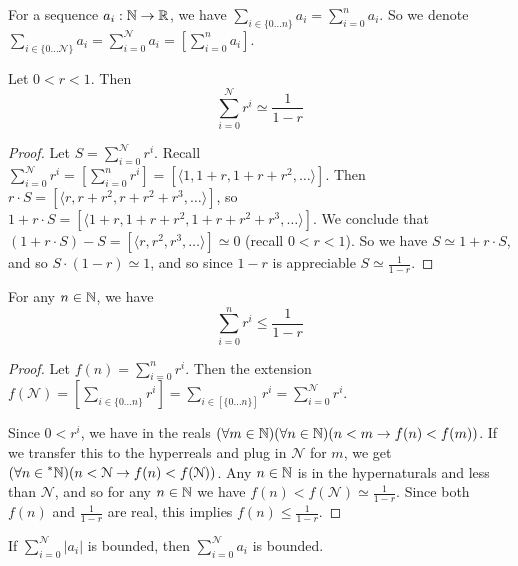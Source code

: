 For a sequence $a_i: \mathbb{N} \to \mathbb{R}$, we have $\sum_{i \in \{0\ldots n\}} a_i = \sum_{i = 0}^n a_i$. So we denote $\sum_{i \in \{0\ldots \mathscr{N}\}} a_i = \sum_{i = 0}^\mathscr{N} a_i = \left[\sum_{i=0}^n a_i\right]$.

\begin{thm}\label{GeometricSeries}
    Let $0 < r < 1$. Then 
    \[ \sum_{i = 0}^\mathcal{N} r^i \simeq \frac{1}{1-r} \]
\end{thm}

\begin{proof}
    Let $S = \sum_{i = 0}^\mathcal{N} r^i$. Recall $\sum_{i = 0}^\mathcal{N} r^i = [\sum_{i = 0}^n r^i] = [\langle 1, 1 + r, 1 + r + r^2, \ldots \rangle]$. Then $r \cdot S = [\langle r, r + r^2, r + r^2 + r^3, \ldots \rangle]$, so $1 + r \cdot S = [\langle 1 + r, 1 + r + r^2, 1 + r + r^2 + r^3, \ldots \rangle]$. We conclude that $(1 + r \cdot S) - S = [\langle r, r^2, r^3, \ldots \rangle] \simeq 0$ (recall $0 < r < 1$). So we have $S \simeq 1 + r \cdot S$, and so $S \cdot (1 - r) \simeq 1$, and so since $1 - r$ is appreciable $S \simeq \frac{1}{1-r}$. 
\end{proof}

\begin{corollary}\label{LessThanGeometricSeries}
    For any $n \in \mathbb{N}$, we have
    \[ \sum_{i = 0}^n r^i \leq \frac{1}{1-r} \]
\end{corollary}

\begin{proof}
    Let $f(n) = \sum_{i = 0}^n r^i$. Then the extension $f(\mathscr{N}) = [\sum_{i \in \{0\ldots n\}} r^i] = \sum_{i \in [\{0\ldots n\}]} r^i = \sum_{i = 0}^\mathscr{N} r^i$.

    Since $0 < r^i$, we have in the reals $(\forall m \in \mathbb{N})(\forall n \in \mathbb{N})(n < m \to f(n) < f(m))$. If we transfer this to the hyperreals and plug in $\mathcal{N}$ for $m$, we get $(\forall n \in \prescript{*}{}{\mathbb{N}})(n < \mathcal{N} \to f(n) < f(\mathcal N))$. Any $n \in \mathbb{N}$ is in the hypernaturals and less than $\mathcal{N}$, and so for any $n \in \mathbb{N}$ we have $f(n) < f(\mathcal{N}) \simeq \frac{1}{1-r}$. Since both $f(n)$ and $\frac{1}{1-r}$ are real, this implies $f(n) \leq \frac{1}{1-r}$.
\end{proof}

\begin{thm}\label{AbsoluteConvergenceImpliesConvergence}
    If $\sum_{i = 0}^\mathcal{N} |a_i|$ is bounded, then $\sum_{i = 0}^\mathcal{N} a_i$ is bounded.
\end{thm}

